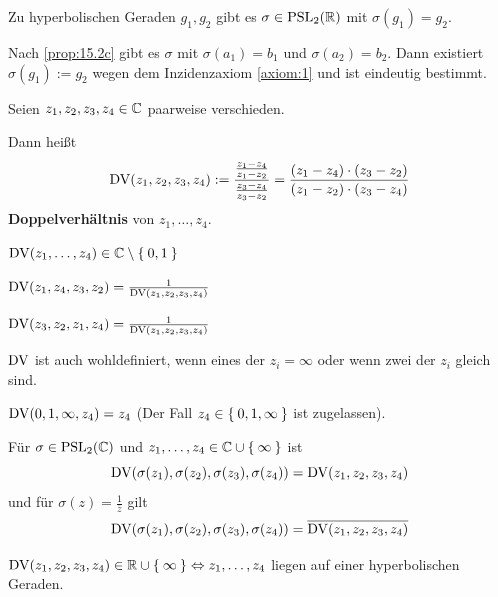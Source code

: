 \begin{bemerkung}%
    Zu hyperbolischen Geraden $g_1, g_2$ gibt es $\sigma \in \mathrm{PSL}_2(\mathbb{R})$
    mit $\sigma(g_1) = g_2$.
\end{bemerkung}
\begin{beweis}
    Nach \cref{prop:15.2c} gibt es $\sigma$ mit $\sigma(a_1) = b_1$
    und $\sigma(a_2) = b_2$. Dann existiert $\sigma(g_1) := g_2$
    wegen dem Inzidenzaxiom \ref{axiom:1} und ist eindeutig bestimmt.
\end{beweis}

\begin{definition}%
    Seien $z_1, z_2, z_3, z_4 \in \mathbb{C}$ paarweise verschieden.

    Dann heißt 
    \[\operatorname{DV}(z_1, z_2, z_3, z_4) := \frac{\frac{z_1 - z_4}{z_1 - z_2}}{\frac{z_3 - z_4}{z_3 - z_2}} = \frac{(z_1 - z_4) \cdot (z_3 - z_2)}{(z_1 - z_2) \cdot (z_3 - z_4)}\]
    \textbf{Doppelverhältnis} von 
    $z_1, \dots, z_4$.
\end{definition}

\begin{bemerkung}
    \begin{bemenum}
        \item $\operatorname{DV}(z_1, \dots, z_4) \in \mathbb{C} \setminus \Set{0,1}$
        \item \label{bem:15.4b.ii} $\operatorname{DV}(z_1, z_4, z_3, z_2) = \frac{1}{\operatorname{DV}(z_1, z_2, z_3, z_4)}$
        \item \label{bem:69.c} $\operatorname{DV}(z_3, z_2, z_1, z_4) = \frac{1}{\operatorname{DV}(z_1, z_2, z_3, z_4)}$
        \item $\operatorname{DV}$ ist auch wohldefiniert, wenn eines der $z_i = \infty$
              oder wenn zwei der $z_i$ gleich sind.
        \item $\operatorname{DV}(0, 1, \infty, z_4) = z_4$ (Der Fall $z_4 \in \Set{0, 1, \infty}$ ist zugelassen).
        \item \label{bem:15.4d} Für $\sigma \in \mathrm{PSL}_2(\mathbb{C})$ und $z_1, \dots, z_4 \in \mathbb{C} \cup \Set{\infty}$
              ist 
              \[\operatorname{DV}(\sigma(z_1), \sigma(z_2), \sigma(z_3), \sigma(z_4)) = \operatorname{DV}(z_1, z_2, z_3, z_4)\]
              und für $\sigma(z) = \frac{1}{\overline{z}}$ gilt
              \[\operatorname{DV}(\sigma(z_1), \sigma(z_2), \sigma(z_3), \sigma(z_4)) = \overline{\operatorname{DV}(z_1, z_2, z_3, z_4)}\]
        \item \label{bem:15.4e} $\operatorname{DV}(z_1, z_2, z_3, z_4) \in \mathbb{R} \cup \Set{\infty} \Leftrightarrow z_1, \dots, z_4$
              liegen auf einer hyperbolischen Geraden.
    \end{bemenum}
\end{bemerkung}

